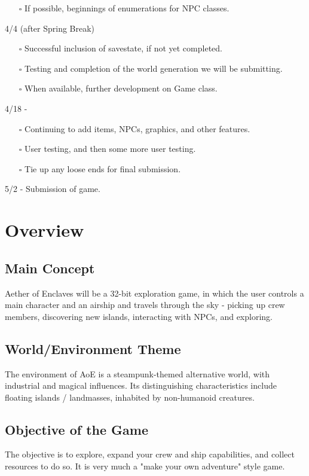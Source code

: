 \documentclass[a4paper]{scrreprt}
\begin{document}
\begin{enumerate}
\begin{itemize}
   \item[$\square$] If possible, beginnings of enumerations for NPC classes.
   \end{itemize}
   4/4 (after Spring Break)
   \begin{itemize}
   \item[$\square$] Successful inclusion of savestate, if not yet completed.
   \item[$\square$] Testing and completion of the world generation we will be submitting.
   \item[$\square$] When available, further development on Game class.
   \end{itemize}
   4/18 - \begin{itemize}
   \item[$\square$] Continuing to add items, NPCs, graphics, and other features.
   \item[$\square$] User testing, and then some more user testing.
   \item[$\square$] Tie up any loose ends for final submission.
   \end{itemize}
   5/2 - Submission of game.
 \end{enumerate}





\chapter{Overview}

\section{Main Concept}
Aether of Enclaves will be a 32-bit exploration game, in which the user controls a main character and an airship and travels through the sky - picking up crew members, discovering new islands, interacting with NPCs, and exploring.

\section{World/Environment Theme}
The environment of AoE is a steampunk-themed alternative world, with industrial and magical influences. Its distinguishing characteristics include floating islands / landmasses, inhabited by non-humanoid creatures.

\section{Objective of the Game}
The objective is to explore, expand your crew and ship capabilities, and collect resources to do so. It is very much a "make your own adventure" style game.
\end{document}
